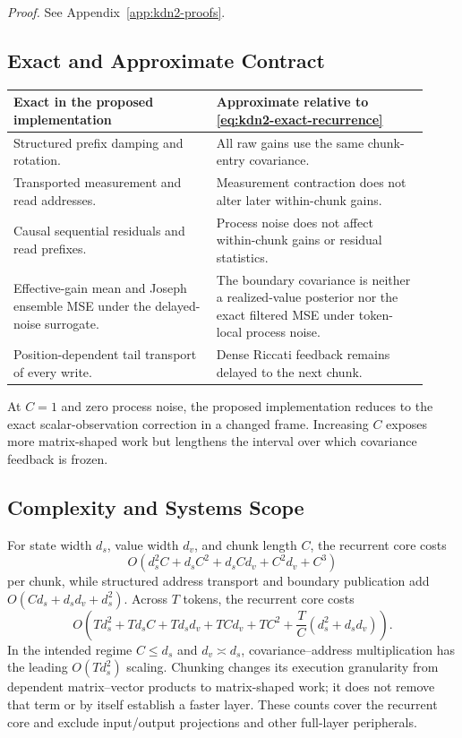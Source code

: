 \documentclass[11pt,letterpaper,logo]{yalearxiv}
\begin{document}
\noindent\textit{Proof.} See Appendix~\ref{app:kdn2-proofs}.

\subsection{Exact and Approximate Contract}
\label{sec:kdn2-contract}

\begin{center}
\small
\begin{tabular}{p{0.45\linewidth}p{0.47\linewidth}}
\toprule
\textbf{Exact in the proposed implementation} &
\textbf{Approximate relative to \eqref{eq:kdn2-exact-recurrence}}\\
\midrule
Structured prefix damping and rotation. &
All raw gains use the same chunk-entry covariance.\\
Transported measurement and read addresses. &
Measurement contraction does not alter later within-chunk gains.\\
Causal sequential residuals and read prefixes. &
Process noise does not affect within-chunk gains or residual statistics.\\
Effective-gain mean and Joseph ensemble MSE under the delayed-noise surrogate. &
The boundary covariance is neither a realized-value posterior nor the exact filtered MSE under
token-local process noise.\\
Position-dependent tail transport of every write. &
Dense Riccati feedback remains delayed to the next chunk.\\
\bottomrule
\end{tabular}
\end{center}

At $C=1$ and zero process noise, the proposed implementation reduces to the exact scalar-observation
correction in a changed frame. Increasing $C$ exposes more matrix-shaped work but lengthens the
interval over which covariance feedback is frozen.

\subsection{Complexity and Systems Scope}
\label{sec:kdn2-complexity}

For state width $d_s$, value width $d_v$, and chunk length $C$, the recurrent core costs
\begin{equation}
  O(
    d_s^2C+d_sC^2+d_sCd_v+C^2d_v+C^3
  )
  \label{eq:kdn2-chunk-complexity}
\end{equation}
per chunk, while structured address transport and boundary publication add
$O(Cd_s+d_sd_v+d_s^2)$. Across $T$ tokens, the recurrent core costs
\begin{equation}
  O\!\left(
    Td_s^2+Td_sC+Td_sd_v+TCd_v+TC^2
    +\frac{T}{C}(d_s^2+d_sd_v)
  \right).
  \label{eq:kdn2-sequence-complexity}
\end{equation}
In the intended regime $C\leq d_s$ and $d_v\asymp d_s$, covariance--address multiplication has
the leading $O(Td_s^2)$ scaling. Chunking changes its execution granularity from dependent
matrix--vector products to matrix-shaped work; it does not remove that term or by itself establish
a faster layer. These counts cover the recurrent core and exclude input/output projections and
other full-layer peripherals.
\end{document}
